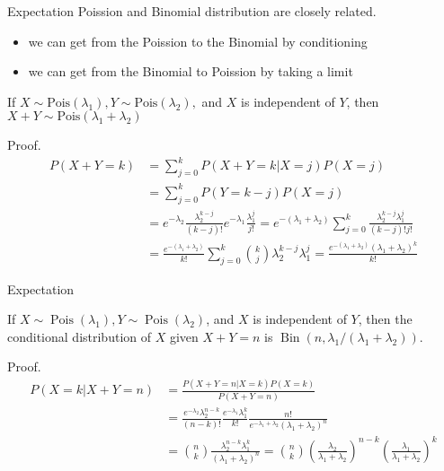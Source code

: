 \documentclass[8pt]{beamer}
\newcommand{\pois}[1]{\text{Pois}(#1)}
\begin{document}
\begin{frame}{Expectation}
    Poission and Binomial distribution are closely related.
    \begin{itemize}
        \item we can get from the Poission to the Binomial by conditioning
        \item we can get from the Binomial to Poission by taking a limit
    \end{itemize}

    \begin{theorem}
        If \(X \sim \text{Pois}(\lambda_1), Y \sim \text{Pois}(\lambda_2),\) and \(X\) is independent of \(Y\), then \(X + Y \sim \pois{\lambda_1 + \lambda_2}\)
    \end{theorem}
    Proof.
    \[
        \begin{aligned}
            P(X+Y=k) &= \sum_{j=0}^k P(X+Y=k|X=j) P(X=j)\\
            &= \sum_{j=0}^k P(Y=k-j) P(X=j) \\
            &= e^{-\lambda_2} \frac{\lambda_2^{k-j}}{(k-j)!} e^{-\lambda_1} \frac{\lambda_1^{j}}{j!} = e^{-(\lambda_1+\lambda_2)} \sum_{j=0}^k \frac{\lambda_2^{k-j} \lambda_1^{j}}{(k-j)! j!} \\
            &= \frac{e^{-(\lambda_1 + \lambda_2)}}{k!} \sum_{j=0}^k \binom{k}{j} \lambda_2^{k-j} \lambda_1^j = \frac{e^{-(\lambda_1 + \lambda_2)} (\lambda_1 + \lambda_2)^k}{k!}
        \end{aligned}
    \]
\end{frame}


\begin{frame}{Expectation}
    \begin{theorem}
        If \(X \sim \operatorname{Pois}(\lambda_1), Y \sim \operatorname{Pois}(\lambda_2)\), and \(X\) is independent of \(Y\), then the conditional distribution of \(X\) given \(X+Y=n\) is \(\operatorname{Bin}(n, \lambda_1 / (\lambda_1 + \lambda_2))\).
    \end{theorem}
    Proof. 
    \[
    \begin{aligned}
        P(X=k|X+Y=n) &= \frac{P(X+Y=n|X=k)P(X=k)}{P(X+Y=n)} \\
        &= \frac{e^{-\lambda_2}\lambda_2^{n-k}}{(n-k)!} \frac{e^{-\lambda_1} \lambda_1^{k}}{k!} \frac{n!}{e^{-\lambda_1 + \lambda_2}(\lambda_1 + \lambda_2)^{n}} \\
        &= \binom{n}{k} \frac{\lambda_2^{n-k}\lambda_1^{k}}{(\lambda_1 +\lambda_2)^{n}} = \binom{n}{k} \left(\frac{\lambda_2}{\lambda_1+\lambda_2}\right)^{n-k} \left(\frac{\lambda_1}{\lambda_1 + \lambda_2}\right)^k
    
    \end{aligned}
    \]
\end{frame}
\end{document}
